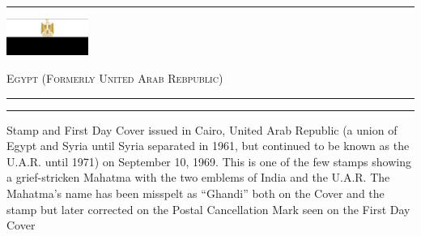 \documentclass[a4paper]{article}
\begin{document}
\hrule
\vspace{8pt}
\begin{minipage}{2cm}
  \includegraphics[height=1.2cm]{images/eg}
\end{minipage}
\hfill
{\scshape\huge Egypt {\small (Formerly United Arab Rebpublic)}}
\vspace{8pt}
\hrule
\vspace{12cm}
\hfill
\begin{minipage}{6cm}
  \hrule \vspace{12pt} Stamp and First Day Cover issued in Cairo,
  United Arab Republic (a union of Egypt and Syria until Syria
  separated in 1961, but continued to be known as the U.A.R. until
  1971) on September 10, 1969. This is one of the few stamps showing a
  grief-stricken Mahatma with the two emblems of India and the
  U.A.R. The Mahatma's name has been misspelt as ``Ghandi'' both on
  the Cover and the stamp but later corrected on the Postal
  Cancellation Mark seen on the First Day Cover
\end{minipage}
\end{document}
